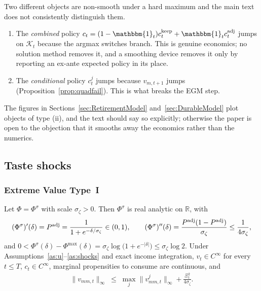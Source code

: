 \begin{remark}
\label{rem:twodiscont}
Two different objects are non-smooth under a hard maximum and the main text does not
consistently distinguish them.
\begin{enumerate}
    \item The \emph{combined} policy $c_t=(1-\mathbbm{1}_t)c_t^{\keep}+\mathbbm{1}_t c_t^{\adj}$
    jumps on $\mathcal{K}_t$ because the argmax switches branch. This is genuine
    economics; no solution method removes it, and a smoothing device removes it only by
    reporting an ex-ante expected policy in its place.
    \item The \emph{conditional} policy $c_t^{j}$ jumps because $v_{m,t+1}$ jumps
    (Proposition~\ref{prop:quadfail}). This is what breaks the EGM step.
\end{enumerate}
The figures in Sections~\ref{sec:RetirementModel} and~\ref{sec:DurableModel} plot
objects of type (ii), and the text should say so explicitly; otherwise the paper is
open to the objection that it smooths away the economics rather than the numerics.
\end{remark}

\subsection{Taste shocks}
\label{subsec:smooth_taste}

\subsubsection{Extreme Value Type~I}

\begin{proposition}
\label{prop:evtaste}
Let $\Phi=\Phi^{\sigma}$ with scale $\sigma_\zeta>0$. Then $\Phi^{\sigma}$ is real
analytic on $\mathbb{R}$, with
\begin{align}
(\Phi^{\sigma})'(\delta) = P^{\mathrm{adj}}=\frac{1}{1+e^{-\delta/\sigma_\zeta}}\in(0,1),
\qquad
(\Phi^{\sigma})''(\delta) = \frac{P^{\mathrm{adj}}(1-P^{\mathrm{adj}})}{\sigma_\zeta}\le\frac{1}{4\sigma_\zeta},
\end{align}
and $0<\Phi^{\sigma}(\delta)-\Phi^{\max}(\delta)=\sigma_\zeta\log\big(1+e^{-|\delta|}\big)\le\sigma_\zeta\log 2$.
Under Assumptions~\ref{as:u}--\ref{as:shocks} and exact income integration,
$v_t\in C^{\infty}$ for every $t\le T$, $c_t\in C^{\infty}$, marginal propensities to
consume are continuous, and
\begin{align}
\big\|v_{mm,t}\big\|_{\infty} \;\le\; \max_{j}\big\|v_{mm,t}^{j}\big\|_{\infty}
+ \frac{\Xi_t^{2}}{4\sigma_\zeta}.
\label{eq:ev_curvature}
\end{align}
\end{proposition}

